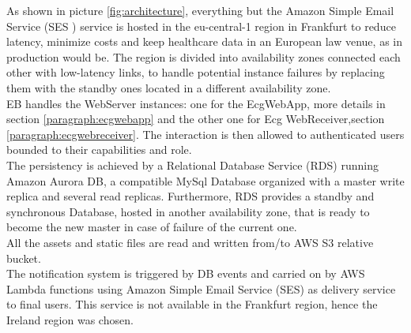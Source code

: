 As shown in picture \ref{fig:architecture}, everything but the Amazon Simple Email Service (SES \cite{AmazonSes}) service is hosted in the eu-central-1 region in Frankfurt to reduce latency, minimize costs and keep healthcare data in an European law venue, as in production would be.
The region is divided into availability zones connected each other with low-latency links, to handle potential instance failures by replacing them with the standby ones located in a different availability zone.\\
EB handles the WebServer instances: one for the EcgWebApp, more details in section \ref{paragraph:ecgwebapp} and the other one for Ecg WebReceiver,section \ref{paragraph:ecgwebreceiver}. The interaction is then allowed to authenticated users bounded to their capabilities and role.\\
The persistency is achieved by a Relational Database Service (RDS) running Amazon Aurora DB, a compatible MySql Database organized with a master write replica and several read replicas.
Furthermore, RDS provides a standby and synchronous Database, hosted in another availability zone, that is ready to become the new master in case of failure of the current one.\\
All the assets and static files are read and written from/to AWS S3 relative bucket.\\
The notification system is triggered by DB events and carried on by AWS Lambda functions using Amazon Simple Email Service (SES) as delivery service to final users. This service is not available in the Frankfurt region, hence the Ireland region was chosen.

